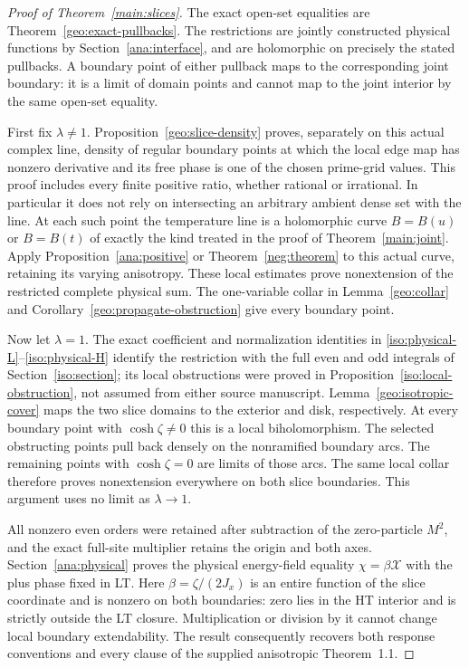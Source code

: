 \documentclass[11pt]{article}
\numberwithin{equation}{section}
\theoremstyle{definition}
\begin{document}
\begin{proof}[Proof of Theorem~\ref{main:slices}]
The exact open-set equalities are Theorem~\ref{geo:exact-pullbacks}.
The restrictions are jointly constructed physical functions by
Section~\ref{ana:interface}, and are holomorphic on precisely the
stated pullbacks. A boundary point of either pullback maps to the
corresponding joint boundary: it is a limit of domain points and
cannot map to the joint interior by the same open-set equality.

First fix \(\lambda\ne1\). Proposition~\ref{geo:slice-density}
proves, separately on this actual complex line, density of regular
boundary points at which the local edge map has nonzero derivative
and its free phase is one of the chosen prime-grid values. This
proof includes every finite positive ratio, whether rational or
irrational. In particular it does not rely on intersecting an
arbitrary ambient dense set with the line. At each such point the
temperature line is a holomorphic curve \(B=B(u)\) or \(B=B(t)\)
of exactly the kind treated in the proof of Theorem~\ref{main:joint}.
Apply Proposition~\ref{ana:positive} or Theorem~\ref{neg:theorem}
to this actual curve, retaining its varying anisotropy. These local estimates prove
nonextension of the restricted complete physical sum. The
one-variable collar in Lemma~\ref{geo:collar} and
Corollary~\ref{geo:propagate-obstruction} give every boundary point.

Now let \(\lambda=1\). The exact coefficient and normalization
identities in \eqref{iso:physical-L}--\eqref{iso:physical-H}
identify the restriction with the full even and odd integrals of
Section~\ref{iso:section}; its local obstructions were proved in
Proposition~\ref{iso:local-obstruction}, not assumed from either
source manuscript. Lemma~\ref{geo:isotropic-cover} maps the two
slice domains to the exterior and disk, respectively. At every
boundary point with \(\cosh\zeta\ne0\) this is a local
biholomorphism. The selected obstructing points pull back densely
on the nonramified boundary arcs. The remaining points with
\(\cosh\zeta=0\) are limits of those arcs. The same local collar
therefore proves nonextension everywhere on both slice boundaries.
This argument uses no limit as \(\lambda\to1\).

All nonzero even orders were retained after subtraction of the
zero-particle \(M^2\), and the exact full-site multiplier retains
the origin and both axes. Section~\ref{ana:physical} proves the
physical energy-field equality \(\chi=\beta\mathcal X\) with
the plus phase fixed in LT. Here \(\beta=\zeta/(2J_x)\) is an
entire function of the slice coordinate and is nonzero on both
boundaries: zero lies in the HT interior and is strictly outside
the LT closure. Multiplication or division by it cannot change
local boundary extendability. The result consequently recovers
both response conventions and every clause of the supplied
anisotropic Theorem~1.1.
\end{proof}
\end{document}

